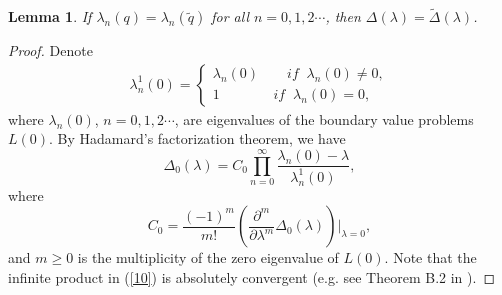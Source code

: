 \documentclass[reqno,11pt,centertags]{amsart}
\numberwithin{equation}{section}
\newtheorem{lemma}[theorem]{Lemma}
\theoremstyle{definition}
\begin{document}
\begin{lemma}\label{lem1}
If $\lambda_{n}(q)=\lambda_{n}(\widetilde{q})$ for all $n=0,1,2\cdots$, then $\Delta(\lambda)=\widetilde{\Delta}(\lambda)$.
\end{lemma}

\begin{proof}
Denote
\begin{align}
  \lambda_{n}^{1}(0)=\begin{cases}
            \lambda_{n}(0)\qquad if\;\; \lambda_{n}(0)\neq0,\\
           1\qquad\quad\;\;\; if\;\;\lambda_{n}(0)=0,
       \end{cases} \nonumber
\end{align}
where $\lambda_{n}(0)$, $n=0,1,2\cdots$, are eigenvalues of the boundary value problems $L(0)$. By Hadamard's factorization theorem, we have
\begin{equation}\label{10}
  \Delta_{0}(\lambda)=C_{0}\prod_{n=0}^{\infty}\frac{\lambda_{n}(0)-\lambda}{\lambda_{n}^{1}(0)},
\end{equation}
where
\begin{equation}
  C_{0}=\frac{(-1)^{m}}{m!}\left(\frac{\partial^{m}}{\partial\lambda^{m}}\Delta_{0}(\lambda)\right)|_{\lambda=0},\nonumber
\end{equation}
and $m\geq0$ is the multiplicity of the zero eigenvalue of $L(0)$. Note that the infinite product in (\ref{10}) is absolutely convergent (e.g. see Theorem B.2 in \cite{Ges-Sim}).


\end{proof}
\end{document}
